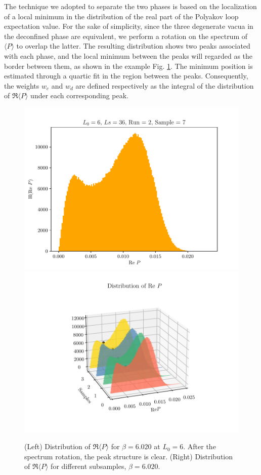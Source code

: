 \documentclass{article}
\begin{document}
The technique we adopted to separate the two phases is based on the localization of a local minimum in the distribution of the real part of the Polyakov loop expectation value. For the sake of simplicity, since the three degenerate vacua in the deconfined phase are equivalent, we perform a rotation on the spectrum of $\langle P \rangle$ to overlap the latter. The resulting distribution shows two peaks associated with each phase, and the local minimum between the peaks will regarded as the border between them, as shown in the example Fig. \ref{fig:distrReP}. %
The minimum position is estimated through a quartic fit in the region between the peaks. %
Consequently, the weights $w_c$ and $w_d$ are defined respectively as the integral of the distribution of $\Re\langle P \rangle$ under each corresponding peak. %
\begin{figure}[htbp]
    \centering
    \includegraphics[width=0.3\hsize]{imgs/ReP_run2.pdf}
    \includegraphics[width=0.4\hsize]{imgs/histograms3d_run2.pdf}

    \caption{(Left) Distribution of $\Re \langle P \rangle$ for $\beta = 6.020$ at $L_0=6$. After the spectrum rotation, the peak structure is clear. 
    (Right) Distribution of $\Re \langle P \rangle$ for different subsamples, $\beta = 6.020$.}
    \label{fig:distrReP}
\end{figure}
\end{document}
